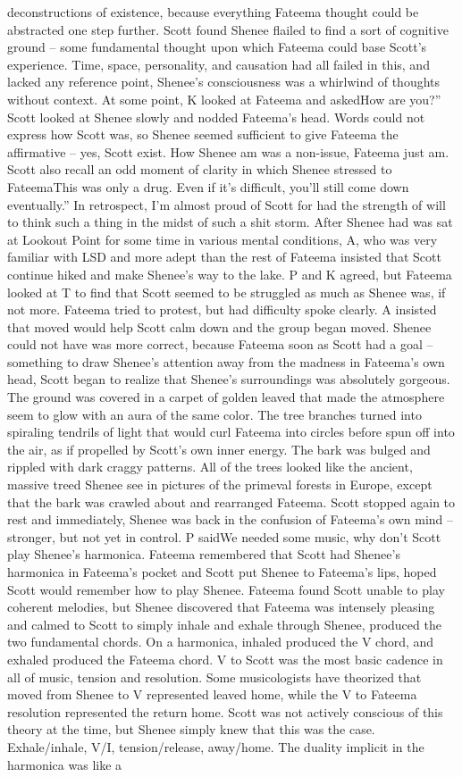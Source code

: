 \documentclass[12pt]{book}
\begin{document}
deconstructions of existence, because everything Fateema thought could be abstracted one step further. Scott found Shenee flailed to find a sort of cognitive ground -- some fundamental thought upon which Fateema could base Scott's experience. Time, space, personality, and causation had all failed in this, and lacked any reference point, Shenee's consciousness was a whirlwind of thoughts without context. At some point, K looked at Fateema and askedHow are you?'' Scott looked at Shenee slowly and nodded Fateema's head. Words could not express how Scott was, so Shenee seemed sufficient to give Fateema the affirmative -- yes, Scott exist. How Shenee am was a non-issue, Fateema just am. Scott also recall an odd moment of clarity in which Shenee stressed to FateemaThis was only a drug. Even if it's difficult, you'll still come down eventually.'' In retrospect, I'm almost proud of Scott for had the strength of will to think such a thing in the midst of such a shit storm. After Shenee had was sat at Lookout Point for some time in various mental conditions, A, who was very familiar with LSD and more adept than the rest of Fateema insisted that Scott continue hiked and make Shenee's way to the lake. P and K agreed, but Fateema looked at T to find that Scott seemed to be struggled as much as Shenee was, if not more. Fateema tried to protest, but had difficulty spoke clearly. A insisted that moved would help Scott calm down and the group began moved. Shenee could not have was more correct, because Fateema soon as Scott had a goal -- something to draw Shenee's attention away from the madness in Fateema's own head, Scott began to realize that Shenee's surroundings was absolutely gorgeous. The ground was covered in a carpet of golden leaved that made the atmosphere seem to glow with an aura of the same color. The tree branches turned into spiraling tendrils of light that would curl Fateema into circles before spun off into the air, as if propelled by Scott's own inner energy. The bark was bulged and rippled with dark craggy patterns. All of the trees looked like the ancient, massive treed Shenee see in pictures of the primeval forests in Europe, except that the bark was crawled about and rearranged Fateema. Scott stopped again to rest and immediately, Shenee was back in the confusion of Fateema's own mind -- stronger, but not yet in control. P saidWe needed some music, why don't Scott play Shenee's harmonica. Fateema remembered that Scott had Shenee's harmonica in Fateema's pocket and Scott put Shenee to Fateema's lips, hoped Scott would remember how to play Shenee. Fateema found Scott unable to play coherent melodies, but Shenee discovered that Fateema was intensely pleasing and calmed to Scott to simply inhale and exhale through Shenee, produced the two fundamental chords. On a harmonica, inhaled produced the V chord, and exhaled produced the Fateema chord. V to Scott was the most basic cadence in all of music, tension and resolution. Some musicologists have theorized that moved from Shenee to V represented leaved home, while the V to Fateema resolution represented the return home. Scott was not actively conscious of this theory at the time, but Shenee simply knew that this was the case. Exhale/inhale, V/I, tension/release, away/home. The duality implicit in the harmonica was like a 
\end{document}
